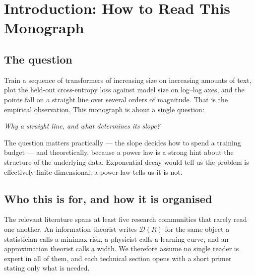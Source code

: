 \documentclass[11pt,a4paper]{article}
\theoremstyle{definition}
\begin{document}
\newpage
\tableofcontents
\newpage

\section{Introduction: How to Read This Monograph}
\label{sec:intro}

\subsection{The question}

Train a sequence of transformers of increasing size on increasing amounts of text, plot the held-out cross-entropy loss against model size on log--log axes, and the points fall on a straight line over several orders of magnitude. That is the empirical observation. This monograph is about a single question:

\begin{center}
\emph{Why a straight line, and what determines its slope?}
\end{center}

The question matters practically --- the slope decides how to spend a training budget --- and theoretically, because a power law is a strong hint about the structure of the underlying data. Exponential decay would tell us the problem is effectively finite-dimensional; a power law tells us it is not.

\subsection{Who this is for, and how it is organised}

The relevant literature spans at least five research communities that rarely read one another. An information theorist writes $\mathcal{D}(R)$ for the same object a statistician calls a minimax risk, a physicist calls a learning curve, and an approximation theorist calls a width. We therefore assume no single reader is expert in all of them, and each technical section opens with a short primer stating only what is needed.
\end{document}
